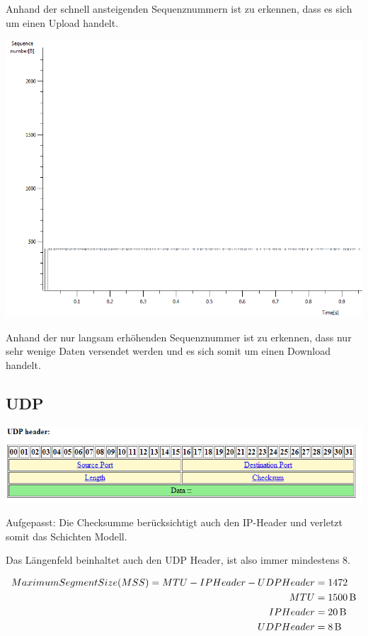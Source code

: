 Anhand der schnell ansteigenden Sequenznummern ist zu erkennen, dass es sich um
einen Upload handelt.

\includegraphics[scale=0.45]{media/tcptraceDownload.png}

Anhand der nur langsam erhöhenden Sequenznummer ist zu erkennen, dass nur sehr
wenige Daten versendet werden und es sich somit um einen Download handelt.


\subsection{UDP}

\includegraphics[width=\textwidth]{media/UDPHeader.png}

Aufgepasst: Die Checksumme berücksichtigt auch den IP-Header und verletzt somit
das Schichten Modell.

Das Längenfeld beinhaltet auch den UDP Header, ist also immer mindestens 8.

\begin{align*}
Maximum Segment Size (MSS) = MTU - IPHeader - UDP Header &= 1472\\
MTU &= \SI{1500}{\byte}\\
IPHeader &= \SI{20}{\byte}\\
UDPHeader &= \SI{8}{\byte}
\end{align*}

